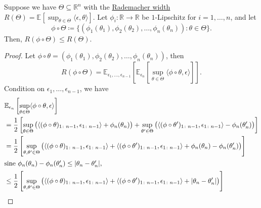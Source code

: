 \begin{theorem}\label{thm:contraction-principle}
	Suppose we have \(\Theta \subseteq \mathbb{R} ^n\) with the \hyperref[def:Rademacher-width]{Rademacher width} \(R(\Theta ) = \mathbb{E}_{}\left[\sup _{\theta \in \Theta } \langle \epsilon , \theta  \rangle \right] \). Let \(\phi _i \colon \mathbb{R} \to \mathbb{R} \) be \(1\)-Lipschitz for \(i=1, \dots , n\), and let
	\[
		\phi \circ \Theta \coloneqq \{ \left(\phi _1(\theta _1), \phi _2(\theta _2), \dots , \phi _n(\theta _n) \right) \colon \theta \in \Theta \}.
	\]
	Then, \(R(\phi \circ \Theta ) \leq R(\Theta )\).
\end{theorem}
\begin{proof}
	Let \(\phi \circ \theta = (\phi _1(\theta _1), \phi _2(\theta _2), \dots , \phi _n(\theta _n))\), then
	\[
		R(\phi \circ \Theta )
		= \mathbb{E}_{\epsilon _1, \dots , \epsilon _{n-1}}\left[ \mathbb{E}_{\epsilon _n}\left[ \sup _{\theta \in \Theta } \langle \phi \circ \theta , \epsilon  \rangle  \right] \right] .
	\]
	Condition on \(\epsilon _1, \dots , \epsilon _{n-1}\), we have
	\begin{align*}
		 & \mathbb{E}_{\epsilon _n}\left[ \sup _{\theta \in \Theta } \langle \phi \circ \theta , \epsilon  \rangle  \right]                                                                                                                                                                                                                                \\
		 & = \frac{1}{2} \left[ \sup _{\theta \in \Theta } \big( \langle (\phi \circ \theta) _{1 \colon n-1}, \epsilon _{1 \colon n-1} \rangle + \phi _n(\theta _n) \big) + \sup _{\theta ^{\prime} \in \Theta } \big( \langle (\phi \circ \theta ^{\prime}) _{1\colon n-1} , \epsilon _{1\colon n-1} \rangle - \phi _n (\theta ^{\prime} _n) \big)\right] \\
		 & = \frac{1}{2} \left[ \sup _{\theta , \theta ^{\prime} \in \Theta } \big( \langle (\phi \circ \theta )_{1 \colon n-1}, \epsilon _{1 \colon n-1} \rangle + \langle (\phi \circ \theta ^{\prime} )_{1\colon n-1} , \epsilon _{1 \colon n-1}\rangle + \phi _n(\theta _n) - \phi _n(\theta ^{\prime} _n) \big) \right]                               \\
		\shortintertext{sine \(\phi _n(\theta _n) - \phi _n(\theta _n^{\prime} ) \leq \vert \theta _n - \theta _n^{\prime} \vert \),}
		 & \leq \frac{1}{2} \left[ \sup _{\theta , \theta ^{\prime} \in \Theta } \big( \langle (\phi \circ \theta )_{1 \colon n-1}, \epsilon _{1 \colon n-1} \rangle + \langle (\phi \circ \theta ^{\prime} )_{1\colon n-1} , \epsilon _{1 \colon n-1} \rangle + \vert \theta _n - \theta _n^{\prime} \vert \big) \right]                                  \\

\end{align*}
\end{proof}
